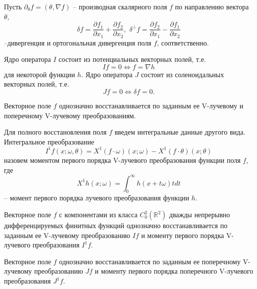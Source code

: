 Пусть $\partial_\theta f=(\theta,\nabla f)$ – производная скалярного поля $f$ по направлению вектора $\theta$, 
$$\delta f=\frac{\partial f_1}{\partial x_1}+\frac{\partial f_2}{\partial x_2},\,\, \delta^\bot f=\frac{\partial f_2}{\partial x_1}-\frac{\partial f_1}{\partial x_2}$$
–дивергенция и ортогональная дивергенция поля $f$, соответственно.


\begin{theorem} Ядро оператора $I$ состоит из потенциальных векторных полей, т.е.
$$If=0 \Leftrightarrow f=\nabla h$$ 
для некоторой функции $h$.
Ядро оператора $J$ состоит из соленоидальных векторных полей, т.е.
$$Jf=0  \Leftrightarrow  \delta f=0.$$
\end{theorem}

\begin{theorem} Векторное поле $f$ однозначно восстанавливается по заданным ее V-лучевому и поперечному V-лучевому преобразованиям.
\end{theorem}

Для полного восстановления поля $f$ введем интегральные данные другого вида.
Интегральное преобразование 
$$I^1 f(x;\omega,\theta)=X^1 (f\cdot\omega)(x;\omega)-X^1 (f\cdot\theta)(x;\theta)$$
назовем моментом первого порядка V-лучевого преобразования функции поля $f$, где
$$X^1 h(x;\omega)=\int_0^\infty h(x+t\omega )tdt$$
– момент первого порядка лучевого преобразования функции $h$.

\begin{theorem} Векторное поле $f$ с компонентами из класса $C_0^2 (\mathbb R^2 )$ дважды непрерывно дифференцируемых финитных функций однозначно восстанавливается по заданным ее V-лучевому преобразованию $If$ и моменту первого порядка V-лучевого преобразования $I^1 f$.
\end{theorem}

\begin{theorem} Векторное поле $f$ однозначно восстанавливается по заданным ее поперечному V-лучевому преобразованию $Jf$ и моменту первого порядка поперечного V-лучевого преобразования $J^1 f$.
\end{theorem}




%
%
%

